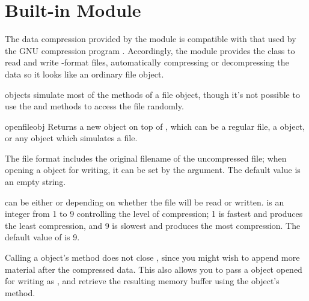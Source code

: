 \section{Built-in Module }
\label{module-gzip}

The data compression provided by the  module is compatible
with that used by the GNU compression program .
Accordingly, the  module provides the  class
to read and write -format files, automatically compressing
or decompressing the data so it looks like an ordinary file object.

 objects simulate most of the methods of a file
object, though it's not possible to use the  and
 methods to access the file randomly.

\renewcommand{\indexsubitem}{(in module gzip)}
\begin{funcdesc}{open}{fileobj}
  Returns a new  object on top of , which
  can be a regular file, a  object, or any object which
  simulates a file.

  The  file format includes the original filename of the
  uncompressed file; when opening a  object for
  writing, it can be set by the  argument.  The default
  value is an empty string.

   can be either  or  depending on
  whether the file will be read or written.   is an
  integer from 1 to 9 controlling the level of compression; 1 is
  fastest and produces the least compression, and 9 is slowest and
  produces the most compression.  The default value of
   is 9.

  Calling a  object's  method does not
  close , since you might wish to append more material
  after the compressed data.  This also allows you to pass a
   object opened for writing as , and
  retrieve the resulting memory buffer using the 
  object's  method.
\end{funcdesc}

\begin{seealso}
\end{seealso}

